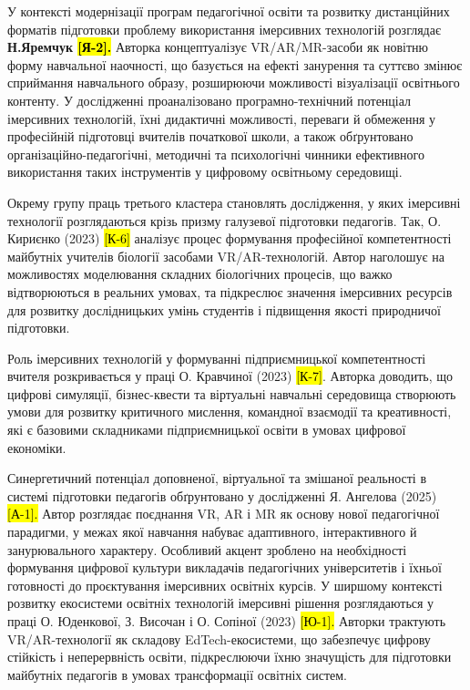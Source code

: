 У контексті модернізації програм педагогічної освіти та розвитку дистанційних форматів підготовки проблему використання імерсивних технологій розглядає \textbf{Н.Яремчук \hl{{[}Я-2{]}.}} Авторка концептуалізує VR/AR/MR-засоби як новітню форму навчальної наочності, що базується на ефекті занурення та суттєво змінює сприймання навчального образу, розширюючи можливості візуалізації освітнього контенту. У дослідженні проаналізовано програмно-технічний потенціал імерсивних технологій, їхні дидактичні можливості, переваги й обмеження у професійній підготовці вчителів початкової школи, а також обґрунтовано організаційно-педагогічні, методичні та психологічні чинники ефективного використання таких інструментів у цифровому освітньому середовищі.

Окрему групу праць третього кластера становлять дослідження, у яких імерсивні технології розглядаються крізь призму галузевої підготовки педагогів. Так, О. Кириєнко (2023) \hl{{[}К-6{]}} аналізує процес формування професійної компетентності майбутніх учителів біології засобами VR/AR-технологій. Автор наголошує на можливостях моделювання складних біологічних процесів, що важко відтворюються в реальних умовах, та підкреслює значення імерсивних ресурсів для розвитку дослідницьких умінь студентів і підвищення якості природничої підготовки.

Роль імерсивних технологій у формуванні підприємницької компетентності вчителя розкривається у праці О. Кравчиної (2023) \hl{{[}К-7{]}}. Авторка доводить, що цифрові симуляції, бізнес-квести та віртуальні навчальні середовища створюють умови для розвитку критичного мислення, командної взаємодії та креативності, які є базовими складниками підприємницької освіти в умовах цифрової економіки.

Синергетичний потенціал доповненої, віртуальної та змішаної реальності в системі підготовки педагогів обґрунтовано у дослідженні Я. Ангелова (2025) \hl{{[}А-1{]}.} Автор розглядає поєднання VR, AR і MR як основу нової педагогічної парадигми, у межах якої навчання набуває адаптивного, інтерактивного й занурювального характеру. Особливий акцент зроблено на необхідності формування цифрової культури викладачів педагогічних університетів і їхньої готовності до проєктування імерсивних освітніх курсів. У ширшому контексті розвитку екосистеми освітніх технологій імерсивні рішення розглядаються у праці О. Юденкової, З. Височан і О. Сопіної (2023) \hl{{[}Ю-1{]}.} Авторки трактують VR/AR-технології як складову EdTech-екосистеми, що забезпечує цифрову стійкість і неперервність освіти, підкреслюючи їхню значущість для підготовки майбутніх педагогів в умовах трансформації освітніх систем.


